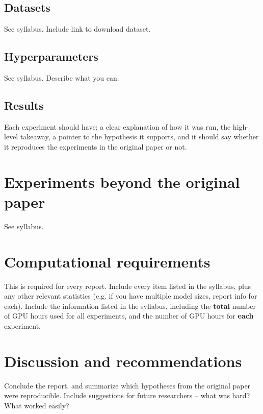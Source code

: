 \documentclass[11pt,a4paper]{article}
\begin{document}
\subsection{Datasets}
See syllabus. Include link to download dataset.

\subsection{Hyperparameters}
See syllabus. Describe what you can.

\subsection{Results}
Each experiment should have: a clear explanation of how it was run, the high-level takeaway, a pointer to the hypothesis it supports, and it should say whether it reproduces the experiments in the original paper or not.

\section{Experiments beyond the original paper}
See syllabus.

\section{Computational requirements}
This is required for every report. Include every item listed in the syllabus, plus any other relevant statistics (e.g. if you have multiple model sizes, report info for each).
Include the information listed in the syllabus, including the \textbf{total} number of GPU hours used for all experiments, and the number of GPU hours for \textbf{each} experiment.

\section{Discussion and recommendations}
Conclude the report, and summarize which hypotheses from the original paper were reproducible. Include suggestions for future researchers -- what was hard? What worked easily? 



\end{document}
